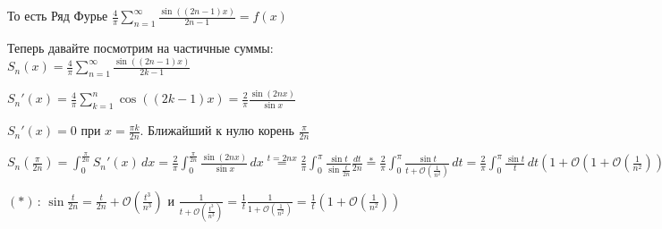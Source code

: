 \begin{example}
\begin{enumerate}
{            То есть Ряд Фурье $\frac{4}{\pi} \sum\limits_{n = 1}^\infty \frac{\sin ((2n - 1)x)}{2n - 1} = f(x)$

            Теперь давайте посмотрим на частичные суммы: $S_n (x) = \frac{4}{\pi} \sum\limits_{n = 1}^\infty \frac{\sin ((2n - 1)x)}{2k - 1}$

            $S_n' (x) = \frac{4}{\pi} \sum\limits_{k = 1}^n \cos ((2k - 1)x) = \frac{2}{\pi} \frac{\sin (2 n x)}{\sin x}$

            $S_n' (x) = 0$ при $x = \frac{\pi k}{2n}$. Ближайший к нулю корень $\frac{\pi}{2n}$

            $S_n (\frac{\pi}{2n}) = \int_0^{\frac{\pi}{2n}} S_n'(x) \, dx = \frac{2}{\pi} \int_0^{\frac{\pi}{2n}} \frac{\sin (2 n x)}{\sin x} \, dx \overset{t = 2nx}{=} \frac{2}{\pi} \int_0^{\pi} \frac{\sin t}{\sin \frac{t}{2n}} \frac{dt}{2n}
            \overset{*}{=} \frac{2}{\pi} \int_0^\pi \frac{\sin t}{t + \mathcal{O}(\frac{1}{n^2})} \, dt = \frac{2}{\pi} \int_0^\pi \frac{\sin t}{t} \, dt (1 + \mathcal{O} (1 + \mathcal{O} (\frac{1}{n^2})))$

            $(*) \, : \, \sin \frac{t}{2n} = \frac{t}{2n} + \mathcal{O}(\frac{t^3}{n^3})$ и $\frac{1}{t + \mathcal{O} (\frac{t^3}{n^3})} = \frac{1}{t} \frac{1}{1 + \mathcal{O} (\frac{1}{n^2})} = \frac{1}{t} (1 + \mathcal{O} (\frac{1}{n^2}))$
        }
    \end{enumerate}
\end{example}

